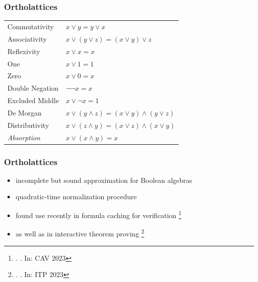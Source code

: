 \documentclass[
    aspectratio=169,
    xcolor={dvipsnames},
]{beamer}
\begin{document}
\begin{frame}
    \frametitle{Ortholattices}






    \begin{center}
        \begin{tabular}{l l}
            Commutativity & \(x \lor y = y \lor x\) \\
            Associativity & \(x \lor (y \lor z) = (x \lor y) \lor z\) \\
            Reflexivity & \(x \lor x = x\) \\
            One & \(x \lor 1 = 1\) \\
            Zero & \(x \lor 0 = x\) \\
            Double Negation & \(\neg \neg x = x\) \\
            Excluded Middle & \(x \lor \neg x = 1\) \\
            De Morgan & \(x \lor (y \land z) = (x \lor y) \land (y \lor z)\) \\
            Distributivity \onslide<2->{\textbf{X}} 
                & \(x \lor (z \land y) = (x \lor z) \land (x \lor y)\) \\
            \pause
            \emph{Absorption} & \(x \lor (x \land y) = x\) 
        \end{tabular}
    \end{center}
\end{frame}

\begin{frame}
    \frametitle{Ortholattices}

    \begin{itemize}
        \item incomplete but sound approximation for Boolean algebras
        \item quadratic-time normalization procedure
        \item found use recently in formula caching for verification
        \footnote{. \emph{}. In: CAV 2023}
        \item as well as in interactive theorem proving \footnote{. \emph{}. In: ITP 2023}
    \end{itemize}

\end{frame}
\end{document}
